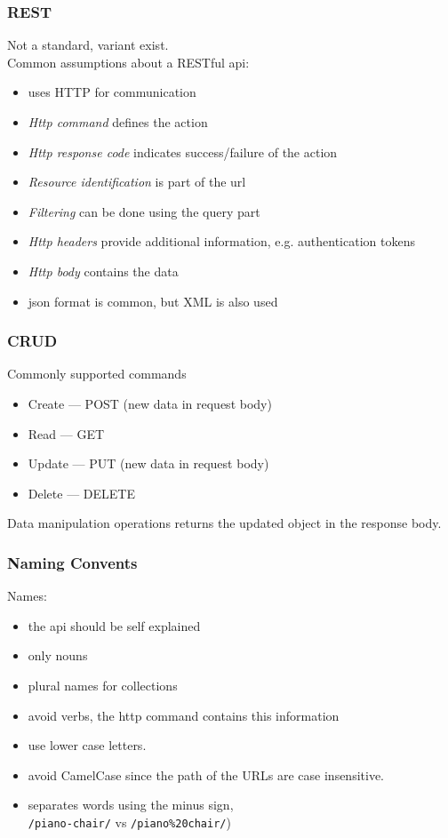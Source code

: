 \begin{frame}[fragile]
\frametitle{REST}
Not a standard, variant exist.
\vspace{3mm}
\\Common assumptions about a RESTful api:
\begin{itemize}
  \item uses HTTP for communication
  \item \emph{Http command} defines the action
  \item \emph{Http response code} indicates success/failure of the action
  \item \emph{Resource identification} is part of the url
  \item \emph{Filtering} can be done using the query part
  \item \emph{Http headers} provide additional information, e.g. authentication tokens
  \item \emph{Http body} contains the data
  \item {json format} is common, but XML is also used
\end{itemize}
\end{frame}


\begin{frame}[fragile]
\frametitle{CRUD}
Commonly supported commands
\begin{itemize}
  \item Create --- POST (new data in request body)
  \item Read --- GET
  \item Update --- PUT (new data in request body)
  \item Delete --- DELETE
\end{itemize}
\vspace{5mm}
Data manipulation operations returns the updated object in the response body.
\end{frame}

\begin{frame}[fragile]
\frametitle{Naming Convents}
\color{structure}
\noindent Names:
\begin{itemize}\color{structure}
  \item the api should be self explained
  \item only nouns
  \item plural names for collections
  \item avoid verbs, the http command contains this information
  \item use lower case letters.
  \item avoid CamelCase since the path of the URLs are case insensitive.
  \item separates words using the minus sign,\\  \texttt{/piano-chair/} vs \texttt{/piano\%20chair/})
\end{itemize}
\end{frame}

